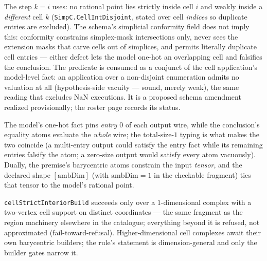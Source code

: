 \begin{bremark}\label{rem:cii-disjoint}
The step $k = i$ uses: no rational point lies strictly inside cell $i$
and weakly inside a \emph{different} cell $k$
(\texttt{SimpC.CellIntDisjoint}, stated over cell \emph{indices} so
duplicate entries are excluded). The schema's simplicial conformity
field does not imply this: conformity constrains simplex-mask
intersections only, never sees the extension masks that carve cells out
of simplices, and permits literally duplicate cell entries --- either
defect lets the model one-hot an overlapping cell and falsifies the
conclusion. The predicate is consumed as a conjunct of the cell
application's model-level fact: an application over a non-disjoint
enumeration admits no valuation at all (hypothesis-side vacuity ---
sound, merely weak), the same reading that excludes NaN executions.
It is a proposed schema amendment realized provisionally; the roster
page records its status.
\end{bremark}

\begin{bremark}
The model's one-hot fact pins \emph{entry $0$} of each output wire,
while the conclusion's equality atoms evaluate the \emph{whole} wire;
the total-size-$1$ typing is what makes the two coincide (a multi-entry
output could satisfy the entry fact while its remaining entries falsify
the atom; a zero-size output would satisfy every atom vacuously).
Dually, the premise's barycentric atoms constrain the input
\emph{tensor}, and the declared shape $[\mathrm{ambDim}]$ (with
$\mathrm{ambDim} = 1$ in the checkable fragment) ties that tensor to the
model's rational point.
\end{bremark}

\begin{bremark}
\texttt{cellStrictInteriorBuild} succeeds only over a $1$-dimensional
complex with a two-vertex cell support on distinct coordinates --- the
same fragment as the region machinery elsewhere in the catalogue;
everything beyond it is refused, not approximated (fail-toward-refusal).
Higher-dimensional cell complexes await their own barycentric builders;
the rule's statement is dimension-general and only the builder gates
narrow it.
\end{bremark}


